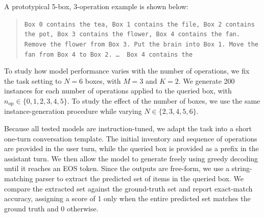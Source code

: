 \documentclass{article}
\begin{document}
A prototypical 5-box, 3-operation example is shown below:

\begin{quote}
\small
\texttt{Box 0 contains the tea, Box 1 contains the file, Box 2 contains the pot, Box 3 contains the flower, Box 4 contains the fan. Remove the flower from Box 3. Put the brain into Box 1. Move the fan from Box 4 to Box 2. \ldots\, Box 4 contains the}
\end{quote}

To study how model performance varies with the number of operations, we fix the task setting to $N=6$ boxes, with $M=3$ and $K=2$. We generate 200 instances for each number of operations applied to the queried box, with $n_{\mathrm{op}} \in \{0,1,2,3,4,5\}$. To study the effect of the number of boxes, we use the same instance-generation procedure while varying $N \in \{2,3,4,5,6\}$.

Because all tested models are instruction-tuned, we adapt the task into a short one-turn conversation template. The initial inventory and sequence of operations are provided in the user turn, while the queried box is provided as a prefix in the assistant turn. We then allow the model to generate freely using greedy decoding until it reaches an EOS token. Since the outputs are free-form, we use a string-matching parser to extract the predicted set of items in the queried box. We compare the extracted set against the ground-truth set and report exact-match accuracy, assigning a score of 1 only when the entire predicted set matches the ground truth and 0 otherwise.

\end{document}
